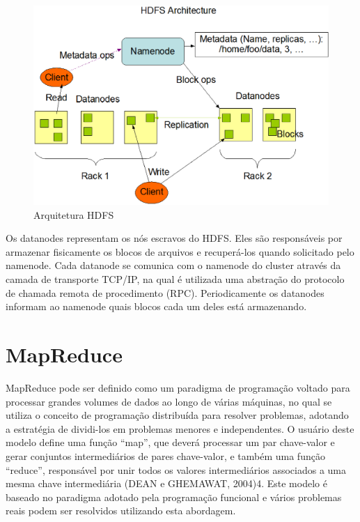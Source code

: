 \begin{figure}[h!]
	\centering
	\includegraphics[keepaspectratio=true,scale=0.45]
	  {figuras/hdfs-arquitetura.eps}
	\caption{Arquitetura HDFS}
	\label{fig-hdfs-arquitetura}
\end{figure}

Os datanodes representam os nós escravos do HDFS. Eles são responsáveis por armazenar  fisicamente os blocos de arquivos e recuperá-los quando solicitado pelo namenode. Cada datanode se comunica com o namenode do cluster através da camada de transporte TCP/IP, na qual é utilizada uma abstração do protocolo de chamada remota de procedimento (RPC). Periodicamente os datanodes informam ao namenode quais blocos cada um deles está armazenando.

\section{MapReduce}

MapReduce pode ser definido como um paradigma de programação voltado para processar grandes volumes de dados ao longo de várias máquinas, no qual se utiliza o conceito de programação distribuída para resolver problemas, adotando a estratégia de dividi-los em problemas menores e independentes. O usuário deste modelo define uma função “map”, que deverá processar um par chave-valor e gerar conjuntos intermediários de pares chave-valor, e também uma função “reduce”, responsável por unir  todos os valores intermediários associados a uma mesma chave intermediária (DEAN e GHEMAWAT, 2004)4. Este modelo é baseado no paradigma adotado pela programação funcional e vários problemas reais podem ser resolvidos utilizando esta abordagem. 

